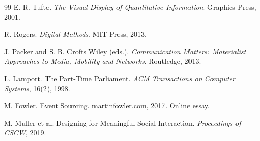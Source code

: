\documentclass[11pt,oneside]{article}
\begin{document}
\begin{thebibliography}{99}
E. R. Tufte.
\newblock \emph{The Visual Display of Quantitative Information}.
\newblock Graphics Press, 2001.

R. Rogers.
\newblock \emph{Digital Methods}.
\newblock MIT Press, 2013.

J. Packer and S. B. Crofts Wiley (eds.).
\newblock \emph{Communication Matters: Materialist Approaches to Media, Mobility and Networks}.
\newblock Routledge, 2013.

L. Lamport.
\newblock The Part-Time Parliament.
\newblock \emph{ACM Transactions on Computer Systems}, 16(2), 1998.

M. Fowler.
\newblock Event Sourcing.
\newblock martinfowler.com, 2017.
\newblock Online essay.

M. Muller et al.
\newblock Designing for Meaningful Social Interaction.
\newblock \emph{Proceedings of CSCW}, 2019.

\end{thebibliography}
\end{document}

